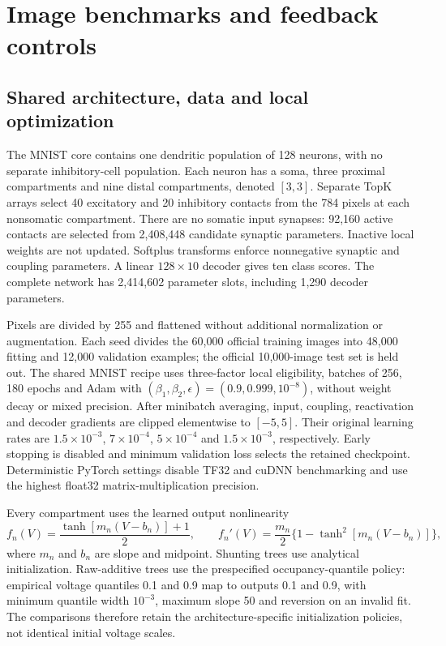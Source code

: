 \section{Image benchmarks and feedback controls}
\label{note:credit_images}
\label{note:artificial}

\subsection{Shared architecture, data and local optimization}

The MNIST core contains one dendritic population of 128 neurons, with no separate inhibitory-cell population. Each neuron has a soma, three proximal compartments and nine distal compartments, denoted $[3,3]$. Separate TopK arrays select 40 excitatory and 20 inhibitory contacts from the 784 pixels at each nonsomatic compartment. There are no somatic input synapses: 92,160 active contacts are selected from 2,408,448 candidate synaptic parameters. Inactive local weights are not updated. Softplus transforms enforce nonnegative synaptic and coupling parameters. A linear $128\times10$ decoder gives ten class scores. The complete network has 2,414,602 parameter slots, including 1,290 decoder parameters.

Pixels are divided by 255 and flattened without additional normalization or augmentation. Each seed divides the 60,000 official training images into 48,000 fitting and 12,000 validation examples; the official 10,000-image test set is held out. The shared MNIST recipe uses three-factor local eligibility, batches of 256, 180 epochs and Adam with $(\beta_1,\beta_2,\epsilon)=(0.9,0.999,10^{-8})$, without weight decay or mixed precision. After minibatch averaging, input, coupling, reactivation and decoder gradients are clipped elementwise to $[-5,5]$. Their original learning rates are $1.5\times10^{-3}$, $7\times10^{-4}$, $5\times10^{-4}$ and $1.5\times10^{-3}$, respectively. Early stopping is disabled and minimum validation loss selects the retained checkpoint. Deterministic PyTorch settings disable TF32 and cuDNN benchmarking and use the highest float32 matrix-multiplication precision.

Every compartment uses the learned output nonlinearity
\begin{equation}
f_n(V)=\frac{\tanh[m_n(V-b_n)]+1}{2},\qquad
f_n'(V)=\frac{m_n}{2}\{1-\tanh^2[m_n(V-b_n)]\},
\label{eq:s_parametric_tanh}
\end{equation}
where $m_n$ and $b_n$ are slope and midpoint. Shunting trees use analytical initialization. Raw-additive trees use the prespecified occupancy-quantile policy: empirical voltage quantiles 0.1 and 0.9 map to outputs 0.1 and 0.9, with minimum quantile width $10^{-3}$, maximum slope 50 and reversion on an invalid fit. The comparisons therefore retain the architecture-specific initialization policies, not identical initial voltage scales.

